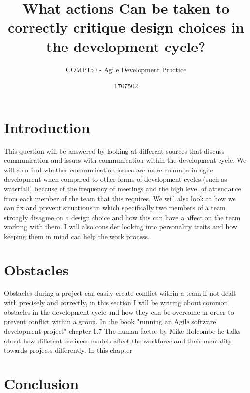 \documentclass{scrartcl}
\title{What actions Can be taken to correctly critique design choices in the development cycle?}
\subtitle{COMP150 - Agile Development Practice}
\author{1707502}
\begin{document}
\maketitle

\abstract{}

\section{Introduction}

This question will be answered by looking at different sources that discuss communication and issues with communication within the development cycle. We will also find whether communication issues are more common in agile development when compared to other forms of development cycles (such as waterfall) because of the frequency of meetings and the high level of attendance from each member of the team that this requires. We will also look at how we can fix and prevent situations in which specifically two members of a team strongly disagree on a design choice and how this can have a affect on the team working with them. I will also consider looking into personality traits and how keeping them in mind can help the work process.

\section{Obstacles}

Obstacles during a project can easily create conflict within a team if not dealt with precisely and correctly, in this section I will be writing about common obstacles in the development cycle and how they can be overcome in order to prevent conflict within a group. In the book "running an Agile software development project" chapter 1.7 The human factor by Mike Holcombe \cite{holcombe2008running} he talks about how different business models affect the workforce and their mentality towards projects differently. In this chapter  

\section{Conclusion}





\end{document}
